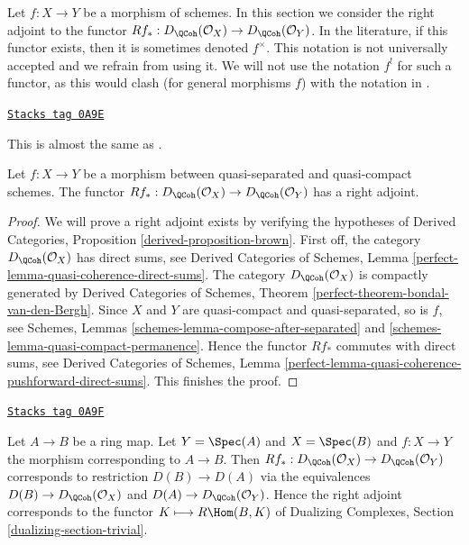 \medskip\noindent
Let $f : X \to Y$ be a morphism of schemes.
In this section we consider the right adjoint to the functor
$Rf_* : D_\QCoh(\mathcal{O}_X) \to D_\QCoh(\mathcal{O}_Y)$.
In the literature, if this functor exists, then it is sometimes
denoted $f^{\times}$. This notation is not universally accepted and we refrain
from using it. We will not use the notation $f^!$ for such a functor,
as this would clash (for general morphisms $f$) with the notation in
\cite{RD}.

\begin{lemma}
\label{duality-lemma-twisted-inverse-image}
\href{https://stacks.math.columbia.edu/tag/0A9E}{\texttt{Stacks tag 0A9E}}

\begin{reference}
This is almost the same as \cite[Example 4.2]{Neeman-Grothendieck}.
\end{reference}
Let $f : X \to Y$ be a morphism between quasi-separated and quasi-compact
schemes. The functor $Rf_* : D_\QCoh(\mathcal{O}_X) \to D_\QCoh(\mathcal{O}_Y)$
has a right adjoint.
\end{lemma}

\begin{proof}
We will prove a right adjoint exists by verifying the hypotheses of
Derived Categories, Proposition \ref{derived-proposition-brown}.
First off, the category $D_\QCoh(\mathcal{O}_X)$ has direct sums, see
Derived Categories of Schemes, Lemma
\ref{perfect-lemma-quasi-coherence-direct-sums}.
The category $D_\QCoh(\mathcal{O}_X)$ is compactly generated by
Derived Categories of Schemes, Theorem
\ref{perfect-theorem-bondal-van-den-Bergh}.
Since $X$ and $Y$ are quasi-compact and quasi-separated, so is $f$, see
Schemes, Lemmas \ref{schemes-lemma-compose-after-separated} and
\ref{schemes-lemma-quasi-compact-permanence}.
Hence the functor $Rf_*$ commutes with direct sums, see
Derived Categories of Schemes, Lemma
\ref{perfect-lemma-quasi-coherence-pushforward-direct-sums}.
This finishes the proof.
\end{proof}

\begin{example}
\label{duality-example-affine-twisted-inverse-image}
\href{https://stacks.math.columbia.edu/tag/0A9F}{\texttt{Stacks tag 0A9F}}

Let $A \to B$ be a ring map. Let $Y = \Spec(A)$ and $X = \Spec(B)$
and $f : X \to Y$ the morphism corresponding to $A \to B$.
Then $Rf_* : D_\QCoh(\mathcal{O}_X) \to D_\QCoh(\mathcal{O}_Y)$
corresponds to restriction $D(B) \to D(A)$ via
the equivalences $D(B) \to D_\QCoh(\mathcal{O}_X)$ and
$D(A) \to D_\QCoh(\mathcal{O}_Y)$. Hence the right adjoint
corresponds to the functor $K \longmapsto R\Hom(B, K)$ of
Dualizing Complexes, Section \ref{dualizing-section-trivial}.
\end{example}

